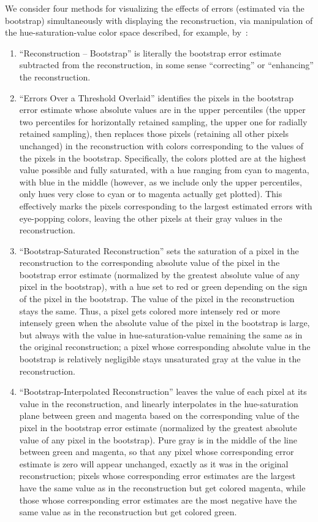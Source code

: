 \documentclass[article]{jdssv}
\begin{document}
We consider four methods for visualizing the effects of errors
(estimated via the bootstrap) simultaneously with displaying
the reconstruction, via manipulation of the hue-saturation-value color space
described, for example, by~\citet{scikit-image}:
%
\begin{enumerate}
\item ``Reconstruction -- Bootstrap'' is literally the bootstrap error estimate
subtracted from the reconstruction, in some sense ``correcting''
or ``enhancing'' the reconstruction.
\item ``Errors Over a Threshold Overlaid'' identifies the pixels
in the bootstrap error estimate whose absolute values
are in the upper percentiles (the upper two percentiles
for horizontally retained sampling,
the upper one for radially retained sampling), then replaces those pixels
(retaining all other pixels unchanged) in the reconstruction with colors
corresponding to the values of the pixels in the bootstrap.
Specifically, the colors plotted are at the highest value possible
and fully saturated, with a hue ranging from cyan to magenta,
with blue in the middle (however, as we include only the upper percentiles,
only hues very close to cyan or to magenta actually get plotted).
This effectively marks the pixels corresponding to the largest estimated errors
with eye-popping colors, leaving the other pixels at their gray values
in the reconstruction.
\item ``Bootstrap-Saturated Reconstruction'' sets the saturation
of a pixel in the reconstruction to the corresponding absolute value
of the pixel in the bootstrap error estimate
(normalized by the greatest absolute value of any pixel in the bootstrap),
with a hue set to red or green depending on the sign of the pixel
in the bootstrap. The value of the pixel in the reconstruction stays the same.
Thus, a pixel gets colored more intensely red or more intensely green
when the absolute value of the pixel in the bootstrap is large,
but always with the value in hue-saturation-value remaining the same
as in the original reconstruction;
a pixel whose corresponding absolute value in the bootstrap
is relatively negligible stays unsaturated gray
at the value in the reconstruction.
\item ``Bootstrap-Interpolated Reconstruction'' leaves the value
of each pixel at its value in the reconstruction, and linearly interpolates
in the hue-saturation plane between green and magenta
based on the corresponding value of the pixel in the bootstrap error estimate
(normalized by the greatest absolute value of any pixel in the bootstrap).
Pure gray is in the middle of the line between green and magenta,
so that any pixel whose corresponding error estimate is zero
will appear unchanged, exactly as it was in the original reconstruction;
pixels whose corresponding error estimates are the largest
have the same value as in the reconstruction but get colored magenta,
while those whose corresponding error estimates are the most negative
have the same value as in the reconstruction but get colored green.
\end{enumerate}
\end{document}

